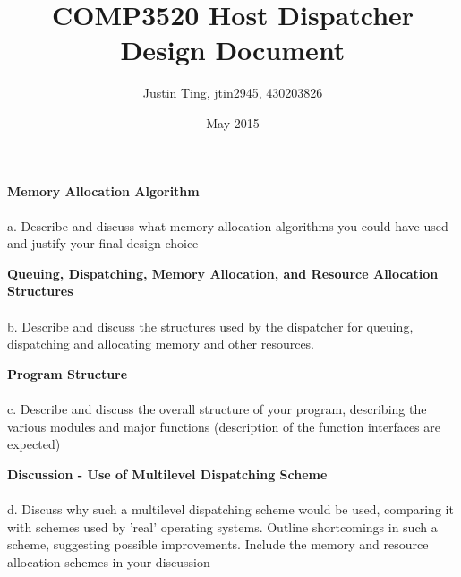 \documentclass[11pt]{article}
\title {COMP3520 Host Dispatcher Design Document}
\author {Justin Ting, jtin2945, 430203826}
\date {May 2015}
\begin{document}
\maketitle

{\large\textbf{Memory Allocation Algorithm}}\\\\
a. Describe and discuss what memory allocation algorithms you could have used
and justify your final design choice

{\large\textbf{Queuing, Dispatching, Memory Allocation, and Resource Allocation
Structures}}\\\\
b. Describe and discuss the structures used by the dispatcher for queuing,
dispatching and allocating memory and other resources.

{\large\textbf{Program Structure}}\\\\
c. Describe and discuss the overall structure of your program, describing the
various modules and major functions (description of the function interfaces are
expected)

{\large\textbf{Discussion - Use of Multilevel Dispatching Scheme}}\\\\
d. Discuss why such a multilevel dispatching scheme would be used, comparing
it with schemes used by 'real' operating systems. Outline shortcomings in such a
scheme, suggesting possible improvements. Include the memory and resource
allocation schemes in your discussion
\end{document}
